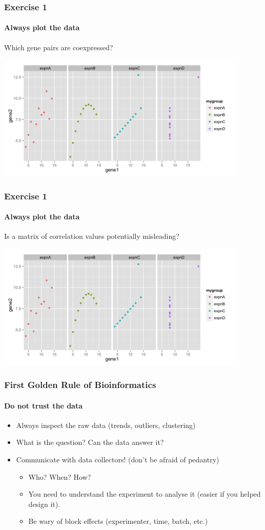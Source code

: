 \documentclass[table]{beamer}
\begin{document}
  \begin{frame}
    \frametitle{Exercise 1}
    \framesubtitle{Always plot the data}
    Which gene pairs are coexpressed?
    \begin{center}
      \includegraphics[width=0.9\textwidth]{images/ex1_rplot} \\
    \end{center}
  \end{frame}

  \begin{frame}
    \frametitle{Exercise 1}
    \framesubtitle{Always plot the data}
    Is a matrix of correlation values potentially misleading?
    \begin{center}
      \includegraphics[width=0.9\textwidth]{images/ex1_rplot} \\
    \end{center}
  \end{frame}

  \begin{frame}
    \frametitle{First Golden Rule of Bioinformatics}
    \framesubtitle{Do not trust the data}
	\begin{itemize}
	  \item Always inspect the raw data (trends, outliers, clustering)
	  \item What is the question? Can the data answer it?
	  \item Communicate with data collectors! (don't be afraid of pedantry)
	  \begin{itemize}
	    \item Who? When? How?
	    \item You need to understand the experiment to analyse it (easier if you helped design it).
	    \item Be wary of block effects (experimenter, time, batch, etc.)
	  \end{itemize}
	\end{itemize}
  \end{frame}
\end{document}
